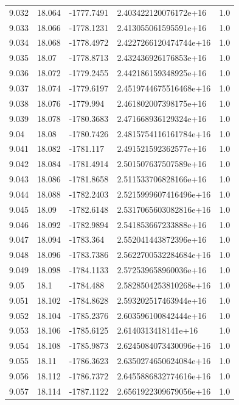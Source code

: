 \begin{tabular}{lllll}
9.032 & 18.064 & -1777.7491 & 2.403422120076172e+16 & 1.0 \\
9.033 & 18.066 & -1778.1231 & 2.413055061595591e+16 & 1.0 \\
9.034 & 18.068 & -1778.4972 & 2.4227266120474744e+16 & 1.0 \\
9.035 & 18.07 & -1778.8713 & 2.432436926176853e+16 & 1.0 \\
9.036 & 18.072 & -1779.2455 & 2.442186159348925e+16 & 1.0 \\
9.037 & 18.074 & -1779.6197 & 2.4519744675516468e+16 & 1.0 \\
9.038 & 18.076 & -1779.994 & 2.461802007398175e+16 & 1.0 \\
9.039 & 18.078 & -1780.3683 & 2.471668936129324e+16 & 1.0 \\
9.04 & 18.08 & -1780.7426 & 2.4815754116161784e+16 & 1.0 \\
9.041 & 18.082 & -1781.117 & 2.491521592362577e+16 & 1.0 \\
9.042 & 18.084 & -1781.4914 & 2.501507637507589e+16 & 1.0 \\
9.043 & 18.086 & -1781.8658 & 2.511533706828166e+16 & 1.0 \\
9.044 & 18.088 & -1782.2403 & 2.5215999607416496e+16 & 1.0 \\
9.045 & 18.09 & -1782.6148 & 2.5317065603082816e+16 & 1.0 \\
9.046 & 18.092 & -1782.9894 & 2.541853667233888e+16 & 1.0 \\
9.047 & 18.094 & -1783.364 & 2.552041443872396e+16 & 1.0 \\
9.048 & 18.096 & -1783.7386 & 2.5622700532284684e+16 & 1.0 \\
9.049 & 18.098 & -1784.1133 & 2.572539658960036e+16 & 1.0 \\
9.05 & 18.1 & -1784.488 & 2.5828504253810268e+16 & 1.0 \\
9.051 & 18.102 & -1784.8628 & 2.593202517463944e+16 & 1.0 \\
9.052 & 18.104 & -1785.2376 & 2.603596100842444e+16 & 1.0 \\
9.053 & 18.106 & -1785.6125 & 2.6140313418141e+16 & 1.0 \\
9.054 & 18.108 & -1785.9873 & 2.6245084073430096e+16 & 1.0 \\
9.055 & 18.11 & -1786.3623 & 2.6350274650624084e+16 & 1.0 \\
9.056 & 18.112 & -1786.7372 & 2.6455886832774616e+16 & 1.0 \\
9.057 & 18.114 & -1787.1122 & 2.6561922309679056e+16 & 1.0 \\

\end{tabular}

